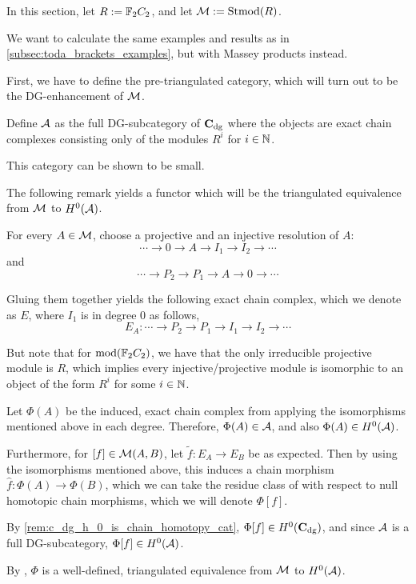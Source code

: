 In this section, let \( R := {\mathbb{F}}_2 C_2 \), and let \( {\mathcal{M}} := \operatorname{Stmod}(R) \).

We want to calculate the same examples and results as in \autoref{subsec:toda_brackets_examples}, but with Massey products instead.

First, we have to define the pre-triangulated category, which will turn out to be the DG-enhancement of \( {\mathcal{M}} \).

\begin{definition}
    Define \( {\mathcal{A}} \) as the full DG-subcategory of \( \operatorname{\mathbf{C}}_{\operatorname{dg}} \) where the objects are exact chain complexes consisting only of the modules \( R^i \) for \( i \in {\mathbb{N}} \).
\end{definition}

This category can be shown to be small.

The following remark yields a functor which will be the triangulated equivalence from \( {\mathcal{M}} \) to \( H^0({\mathcal{A}}) \).

\begin{remark}
    For every \( A \in {\mathcal{M}} \), choose a projective and an injective resolution of \( A \):
    \[
        \cdots \to 0 \to A \to I_1 \to I_2 \to \cdots
    \]
    and
    \[
        \cdots \to P_2 \to P_1 \to A \to 0 \to \cdots
    \]

    Gluing them together yields the following exact chain complex, which we denote as \( E \), where \( I_1 \) is in degree \( 0 \) as follows,
    \[
        E_A: \cdots \to P_2 \to P_1 \to I_1 \to I_2 \to \cdots
    \]

    But note that for \( \operatorname{mod}({\mathbb{F}}_2 C_2) \), we have that the only irreducible projective module is \( R \), which implies every injective/projective module is isomorphic to an object of the form \( R^i \) for some \( i \in {\mathbb{N}} \).

    Let \( \Phi(A) \) be the induced, exact chain complex from applying the isomorphisms mentioned above in each degree. Therefore, \( \Phi(A) \in {\mathcal{A}} \), and also \( \Phi(A) \in H^0({\mathcal{A}}) \).

    Furthermore, for \( [f] \in {\mathcal{M}}(A, B) \), let \( \tilde{f}: E_A \to E_B \) be as expected. Then by using the isomorphisms mentioned above, this induces a chain morphism \( \hat{f}: \Phi(A) \to \Phi(B) \), which we can take the residue class of with respect to null homotopic chain morphisms, which we will denote \( \Phi[f] \).

    By \autoref{rem:c_dg_h_0_is_chain_homotopy_cat}, \( \Phi[f] \in H^0(\operatorname{\mathbf{C}}_{\operatorname{dg}}) \), and since \( {\mathcal{A}} \) is a full DG-subcategory, \( \Phi[f] \in H^0({\mathcal{A}}) \).

    By \cite[Section 7.5]{Krause_2007}, \( \Phi \) is a well-defined, triangulated equivalence from \( {\mathcal{M}} \) to \( H^0({\mathcal{A}}) \).
\end{remark}

